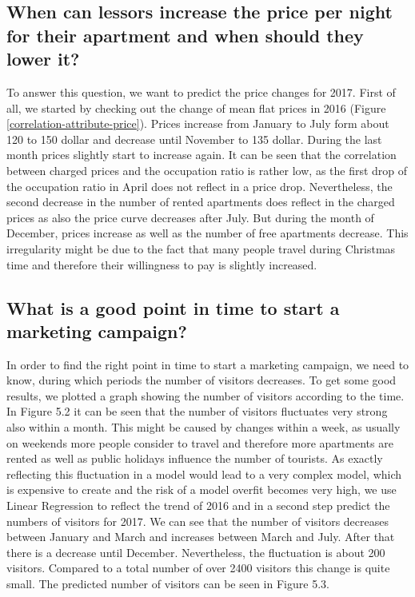 \documentclass[journal]{IEEEtran}
\begin{document}
\subsection{When can lessors increase the price per night for their apartment and when should they lower it?}
To answer this question, we want to predict the price changes for 2017. First of all, we started by checking out the change of mean flat prices in 2016 (Figure \ref{correlation-attribute-price}). 
Prices increase from January to July form about 120 to 150 dollar and decrease until November to 135 dollar. During the last month prices slightly start to increase again. It can be seen that the correlation between charged prices and the occupation ratio is rather low, as the first drop of the occupation ratio in April does not reflect in a price drop. Nevertheless, the second decrease in the number of rented apartments does reflect in the charged prices as also the price curve decreases after July. But during the month of December, prices increase as well as the number of free apartments decrease. This irregularity might be due to the fact that many people travel during Christmas time and therefore their willingness to pay is slightly increased. 

\subsection{What is a good point in time to start a marketing campaign?}
In order to find the right point in time to start a marketing campaign, we need to know, during which periods the number of visitors decreases. To get some good results, we plotted a graph showing the number of visitors according to the time.
In Figure 5.2 it can be seen that the number of visitors fluctuates very strong also within a month. This might be caused by changes within a week, as usually on weekends more people consider to travel and therefore more apartments are rented as well as public holidays influence the number of tourists. As exactly reflecting this fluctuation in a model would lead to a very complex model, which is expensive to create and the risk of a model overfit becomes very high, we use Linear Regression to reflect the trend of 2016 and in a second step predict the numbers of visitors for 2017. We can see that the number of visitors decreases between January and March and increases between March and July. After that there is a decrease until December. Nevertheless, the fluctuation is about 200 visitors. Compared to a total number of over 2400 visitors this change is quite small.
The predicted number of visitors can be seen in Figure 5.3.
\end{document}
